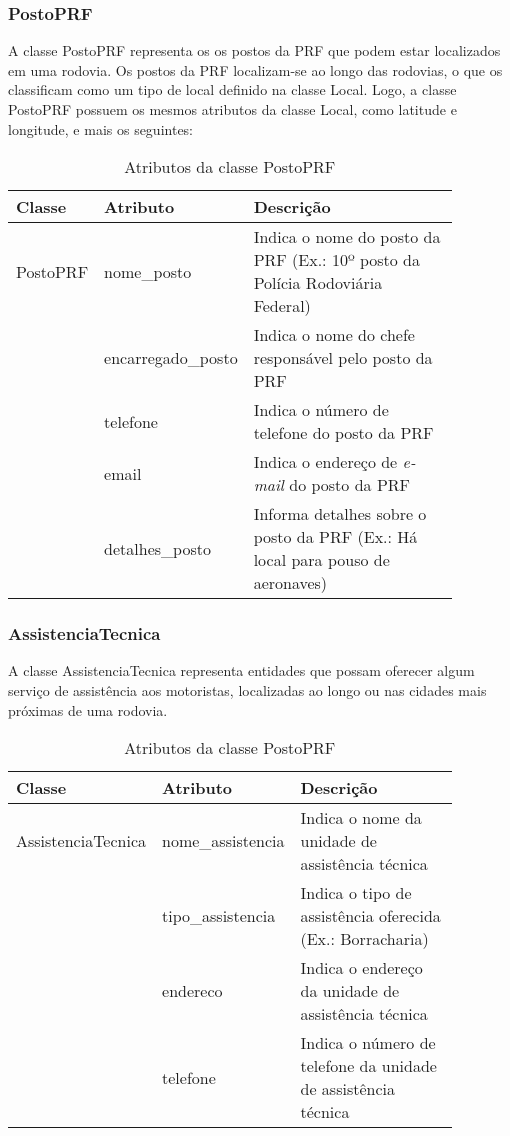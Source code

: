 \subsubsection*{\textbf{PostoPRF}}

  A classe PostoPRF representa os os postos da PRF que podem estar localizados em uma rodovia.
  Os postos da PRF localizam-se ao longo das rodovias, o que os classificam como um tipo de local definido na
  classe Local. Logo, a classe PostoPRF possuem os mesmos atributos da classe Local, como latitude e longitude,
  e mais os seguintes:
  
    \begin{table*}[!h]
    \centering
    \begin{tabular}{p{0.15\linewidth}p{0.23\linewidth}p{0.5\linewidth}}
      \hline
      \textbf{Classe} & \textbf{Atributo} & \textbf{Descrição}\\
      \hline
	PostoPRF & nome\_posto & Indica o nome do posto da PRF (Ex.: 10º posto da Polícia Rodoviária Federal)\\
		 & encarregado\_posto & Indica o nome do chefe responsável pelo posto da PRF\\
		 & telefone & Indica o número de telefone do posto da PRF\\
		 & email & Indica o endereço de \textit{e-mail} do posto da PRF\\
		 & detalhes\_posto & Informa detalhes sobre o posto da PRF (Ex.: Há local para pouso de aeronaves)\\
      \hline
    \end{tabular}
    \caption{Atributos da classe PostoPRF}
    \label{tab:attr_postoprf}
    \end{table*}
    
\subsubsection*{\textbf{AssistenciaTecnica}}

  A classe AssistenciaTecnica representa entidades que possam oferecer algum serviço de assistência aos motoristas, localizadas 
  ao longo ou nas cidades mais próximas de uma rodovia.
  
    \begin{table*}[!h]
    \centering
    \begin{tabular}{p{0.15\linewidth}p{0.23\linewidth}p{0.5\linewidth}}
      \hline
      \textbf{Classe} & \textbf{Atributo} & \textbf{Descrição}\\
      \hline
	AssistenciaTecnica & nome\_assistencia & Indica o nome da unidade de assistência técnica\\
			   & tipo\_assistencia & Indica o tipo de assistência oferecida (Ex.: Borracharia)\\
			   & endereco & Indica o endereço da unidade de assistência técnica\\
			   & telefone & Indica o número de telefone da unidade de assistência técnica\\
      \hline
    \end{tabular}
    \caption{Atributos da classe PostoPRF}
    \label{tab:attr_postoprf}
    \end{table*}
    
